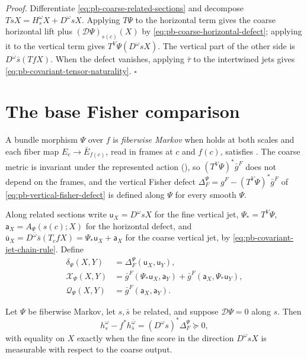 \noindent\emph{Proof.}
Differentiate \eqref{eq:pb-coarse-related-sections} and decompose
\(TsX=H_s^\omega X+D^\omega sX\). Applying \(T\Psi\) to the horizontal term gives the coarse horizontal
lift plus \((\mathcal D\Psi)_{s(c)}(X)\) by \eqref{eq:pb-coarse-horizontal-defect}; applying it to the
vertical term gives \(T^V\Psi(D^\omega sX)\). The vertical part of the other side is
\(D^{\bar\omega}\bar s(TfX)\). When the defect vanishes, applying \(\bar\tau\) to the intertwined jets
gives \eqref{eq:pb-covariant-tensor-naturality}. \hfill$\square$

\section{The base Fisher comparison}
\label{sec:pb-base-fisher-comparison}

A bundle morphism \(\Psi\) over \(f\) is \emph{fiberwise Markov} when 
holds at both scales and each fiber map \(E_c\to\bar E_{f(c)}\), read in frames at \(c\) and
\(f(c)\), satisfies . The coarse metric is invariant under the
represented action (), so \((T^V\Psi)^*\bar g^F\) does not
depend on the frames, and the vertical Fisher defect \(\Delta_F^\Psi=g^F-(T^V\Psi)^*\bar g^F\) of
\eqref{eq:pb-vertical-fisher-defect} is defined along \(\Psi\) for every smooth \(\Psi\).

Along related sections write \(\mathsf u_X=D^\omega sX\) for the fine vertical jet, \(\Psi_*=T^V\Psi\),
\(\mathsf a_X=A_\Psi(s(c);X)\) for the horizontal defect, and
\(\bar{\mathsf u}_X=D^{\bar\omega}\bar s(T_cfX)=\Psi_*\mathsf u_X+\mathsf a_X\) for the coarse vertical
jet, by \eqref{eq:pb-covariant-jet-chain-rule}. Define
\begin{align}
\delta_\Psi(X,Y)&=\Delta_F^\Psi(\mathsf u_X,\mathsf u_Y),
\label{eq:pb-base-fisher-defect}\\
\mathcal X_\Psi(X,Y)&=\bar g^F(\Psi_*\mathsf u_X,\mathsf a_Y)+\bar g^F(\mathsf a_X,\Psi_*\mathsf u_Y),
\label{eq:pb-cross-anomaly-tensor}\\
\mathcal Q_\Psi(X,Y)&=\bar g^F(\mathsf a_X,\mathsf a_Y).
\label{eq:pb-quadratic-anomaly-tensor}
\end{align}

Let \(\Psi\) be fiberwise Markov, let \(s,\bar s\) be related, and suppose \(\mathcal D\Psi=0\) along
\(s\). Then
\begin{equation}
h_s^\omega-f^*h_{\bar s}^{\bar\omega}
=(D^\omega s)^*\Delta_F^\Psi\succeq0,
\label{eq:pb-pullback-fisher-contraction}
\end{equation}
with equality on \(X\) exactly when the fine score in the direction \(D^\omega sX\) is measurable with
respect to the coarse output. 

